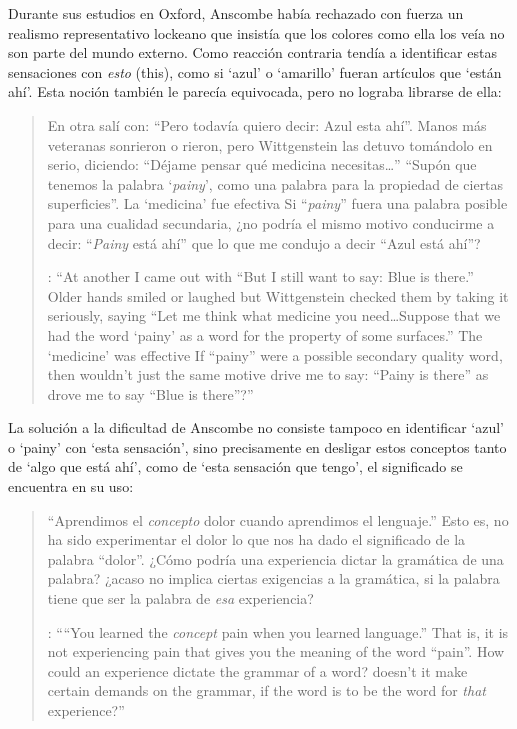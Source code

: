 Durante sus estudios en Oxford, Anscombe había rechazado con fuerza un realismo representativo lockeano que insistía que los colores como ella los veía no son parte del mundo externo. Como reacción contraria tendía a identificar estas sensaciones con \emph{esto} (this), como si `azul' o `amarillo' fueran artículos que `están ahí'. Esta noción también le parecía equivocada, pero no lograba librarse de ella: \blockquote[{\Cite[viii]{anscombe1981metaphysics}}: \enquote{At another  I came out with ``But I still want to say: Blue is there.'' Older hands smiled or laughed but Wittgenstein checked them by taking it seriously, saying ``Let me think what medicine you need\ldots Suppose that we had the word `painy' as a word for the property of some surfaces.'' The `medicine' was effective \textelp{} If ``painy'' were a possible secondary quality word, then wouldn't just the same motive drive me to say: ``Painy is there'' as drove me to say ``Blue is there''?}]{En otra  salí con: ``Pero todavía quiero decir: Azul esta ahí''. Manos más veteranas sonrieron o rieron, pero Wittgenstein las detuvo tomándolo en serio, diciendo: ``Déjame pensar qué medicina necesitas\ldots'' ``Supón que tenemos la palabra `\emph{painy}', como una palabra para la propiedad de ciertas superficies''. La `medicina' fue efectiva \textelp{} Si ``\emph{painy}'' fuera una palabra posible para una cualidad secundaria, ¿no podría el mismo motivo conducirme a decir: ``\emph{Painy} está ahí'' que lo que me condujo a decir ``Azul está ahí''?} La solución a la dificultad de Anscombe no consiste tampoco en identificar `azul' o `painy' con `esta sensación', sino precisamente en desligar estos conceptos tanto de `algo que está ahí', como de `esta sensación que tengo', el significado se encuentra en su uso: \blockquote[{\Cite[114]{anscombe1981parmenides:qli}}: \enquote{``You learned the \emph{concept} pain when you learned language.'' That is, it is not experiencing pain that gives you the meaning of the word ``pain''. How could an experience dictate the grammar of a word? \textelp{} doesn't it make certain demands on the grammar, if the word is to be the word for \emph{that} experience?}]{``Aprendimos el \emph{concepto} dolor cuando aprendimos el lenguaje.'' Esto es, no ha sido experimentar el dolor lo que nos ha dado el significado de la palabra ``dolor''. ¿Cómo podría una experiencia dictar la gramática de una palabra? \textelp{} ¿acaso no implica ciertas exigencias a la gramática, si la palabra tiene que ser la palabra de \emph{esa} experiencia?}

